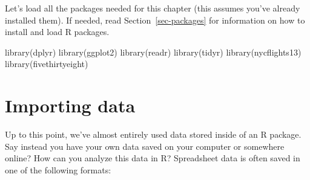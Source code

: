 \documentclass[
  letterpaper,
  DIV=11,
  numbers=noendperiod]{scrreprt}
\newenvironment{Shaded}{\begin{snugshade}}{\end{snugshade}}
\newcommand{\FunctionTok}[1]{\textcolor[rgb]{0.28,0.35,0.67}{#1}}
\newcommand{\NormalTok}[1]{\textcolor[rgb]{0.00,0.23,0.31}{#1}}
\theoremstyle{definition}
\theoremstyle{remark}
\begin{document}
Let's load all the packages needed for this chapter (this assumes you've
already installed them). If needed, read Section~\ref{sec-packages} for
information on how to install and load R packages.

\begin{Shaded}
\begin{Highlighting}[]
\FunctionTok{library}\NormalTok{(dplyr)}
\FunctionTok{library}\NormalTok{(ggplot2)}
\FunctionTok{library}\NormalTok{(readr)}
\FunctionTok{library}\NormalTok{(tidyr)}
\FunctionTok{library}\NormalTok{(nycflights13)}
\FunctionTok{library}\NormalTok{(fivethirtyeight)}
\end{Highlighting}
\end{Shaded}

\hypertarget{sec-csv}{%
\section{Importing data}\label{sec-csv}}

Up to this point, we've almost entirely used data stored inside of an R
package. Say instead you have your own data saved on your computer or
somewhere online? How can you analyze this data in R? Spreadsheet data
is often saved in one of the following formats:
\end{document}

